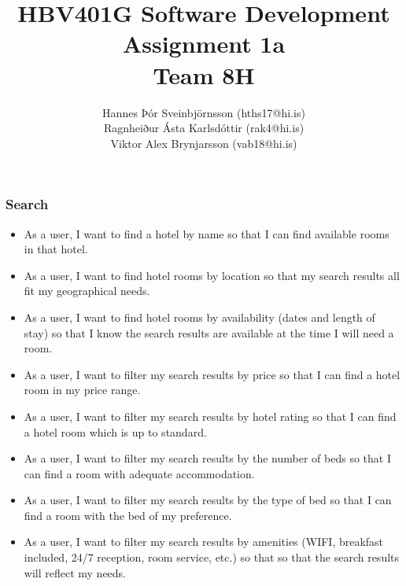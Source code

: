 \documentclass[english,a4paper,12pt,twoside]{article}
\title{
  \Large HBV401G Software Development\\
  \Huge Assignment 1a\\
  Team 8H
}
\author{
  Hannes Þór Sveinbjörnsson (hths17@hi.is)\\
  Ragnheiður Ásta Karlsdóttir (rak4@hi.is)\\
  Viktor Alex Brynjarsson (vab18@hi.is)\\
}
\begin{document}
\maketitle
\thispagestyle{empty}
\clearpage
\setcounter{page}{1}
\newpage
{}
\cfoot{\thepage}

\subsubsection*{Search}
\begin{itemize}
  \item As a user, I want to find a hotel by name so that I can find available rooms in that hotel.
  \item As a user, I want to find hotel rooms by location so that my search results all fit my geographical needs.
  \item As a user, I want to find hotel rooms by availability (dates and length of stay) so that I know the search results are available at the time I will need a room.
  \item As a user, I want to filter my search results by price so that I can find a hotel room in my price range.
  \item As a user, I want to filter my search results by hotel rating so that I can find a hotel room which is up to standard.
  \item As a user, I want to filter my search results by the number of beds so that I can find a room with adequate accommodation.
  \item As a user, I want to filter my search results by the type of bed so that I can find a room with the bed of my preference.
  \item As a user, I want to filter my search results by amenities (WIFI, breakfast included, 24/7 reception, room service, etc.) so that so that the search results will reflect my needs.
\end{itemize}
\end{document}

